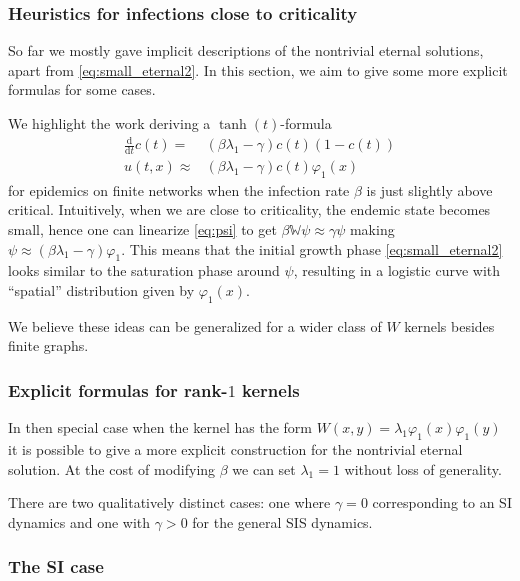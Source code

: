 \documentclass{article}
\renewcommand{\d}{\mathrm{d}}
\newcommand{\W}{\mathbb{W}}
\newcommand{\1}[1]{{\mathds{1}}_{\left\{#1\right\}}}
\newcommand{\rem}[1]{{#1}}
\begin{document}
\subsubsection{Heuristics for infections close to criticality}

So far we mostly gave implicit descriptions of the nontrivial eternal solutions, apart from \eqref{eq:small_eternal2}. In this section, we aim to give some more explicit formulas for some cases.

We highlight the work \cite{NIMFA_time_dependent} deriving a $\tanh(t)$-formula
\begin{align*}
	\frac{\d}{\d t} c(t)=&(\beta \lambda_1-\gamma )c(t)\left(1-c(t) \right)\\
	u(t,x) \approx &(\beta \lambda_1-\gamma)c(t)\varphi_1(x)
\end{align*}
 for epidemics on finite networks when the infection rate $\beta$ is just slightly above critical. Intuitively, when we are close to criticality, the endemic state becomes small, hence one can linearize \eqref{eq:psi}  to get $\beta \W \psi \approx \gamma \psi$ making $\psi \approx (\beta \lambda_1-\gamma) \varphi_1.$ This means that the initial growth phase \eqref{eq:small_eternal2} looks similar to the saturation phase around $\psi$, resulting in a logistic curve with ``spatial'' distribution given by $\varphi_1(x).$

We believe these ideas can be generalized for a wider class of $W$ kernels \rem{besides finite graphs.}


\subsubsection{Explicit formulas for rank-$1$ kernels}


In then special case when the kernel has the form $W(x,y)=\lambda_1 \varphi_1(x)\varphi_1(y)$ it is possible to give a more explicit construction for the nontrivial eternal solution. At the cost of modifying $\beta$ we can set $\lambda_1=1$ without loss of generality. 

There are two qualitatively distinct cases: one where $\gamma=0$ corresponding to an SI dynamics and one with $\gamma>0$ for the general SIS dynamics.



\subsubsection*{The SI case}
\end{document}
